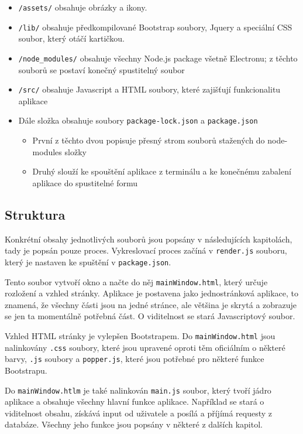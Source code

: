 \documentclass[11pt]{article}
\providecommand{\tightlist}{\setlength{\itemsep}{1pt}\setlength{\parskip}{1pt}}
\let\oldtexttt\texttt
\renewcommand{\texttt}[1]{\oldtexttt{\textcolor{codehighlight}{#1}}}
\begin{document}
\begin{itemize}
\tightlist
\item
  \texttt{/assets/} obsahuje obrázky a ikony.
\item
  \texttt{/lib/} obsahuje předkompilované Bootstrap soubory, Jquery a
  speciální CSS soubor, který otáčí kartičkou.
\item
  \texttt{/node\_modules/} obsahuje všechny Node.js package všetně
  Electronu; z těchto souborů se postaví konečný spustitelný soubor
\item
  \texttt{/src/} obsahuje Javascript a HTML soubory, které zajišťují
  funkcionalitu aplikace
\item
  Dále složka obsahuje soubory \texttt{package-lock.json} a
  \texttt{package.json}

  \begin{itemize}
  \tightlist
  \item
    První z těchto dvou popisuje přesný strom souborů stažených do
    node-modules složky
  \item
    Druhý slouží ke spouštění aplikace z terminálu a ke konečnému
    zabalení aplikace do spustitelné formu
  \end{itemize}
\end{itemize}

\hypertarget{struktura}{%
\subsection{Struktura}\label{struktura}}

Konkrétní obsahy jednotlivých souborů jsou popsány v následujících
kapitolách, tady je popsán pouze proces. Vykreslovací proces začíná v
\texttt{render.js} souboru, který je nastaven ke spuštění v
\texttt{package.json}.

Tento soubor vytvoří okno a načte do něj \texttt{mainWindow.html}, který
určuje rozložení a vzhled stránky. Aplikace je postavena jako
jednostránková aplikace, to znamená, že všechny části jsou na jedné
stránce, ale většina je skrytá a zobrazuje se jen ta momentálně potřebná
část. O viditelnost se stará Javascriptový soubor.

Vzhled HTML stránky je vylepšen Bootstrapem. Do \texttt{mainWindow.html}
jsou nalinkovány \texttt{.css} soubory, které jsou upravené oproti těm
oficiálním o některé barvy, \texttt{.js} soubory a \texttt{popper.js},
které jsou potřebné pro některé funkce Bootstrapu.

Do \texttt{mainWindow.htlm} je také nalinkován \texttt{main.js} soubor,
který tvoří jádro aplikace a obsahuje všechny hlavní funkce aplikace.
Například se stará o viditelnost obsahu, získává input od uživatele a
posílá a příjímá requesty z databáze. Všechny jeho funkce jsou popsány v
některé z dalších kapitol.
\end{document}

